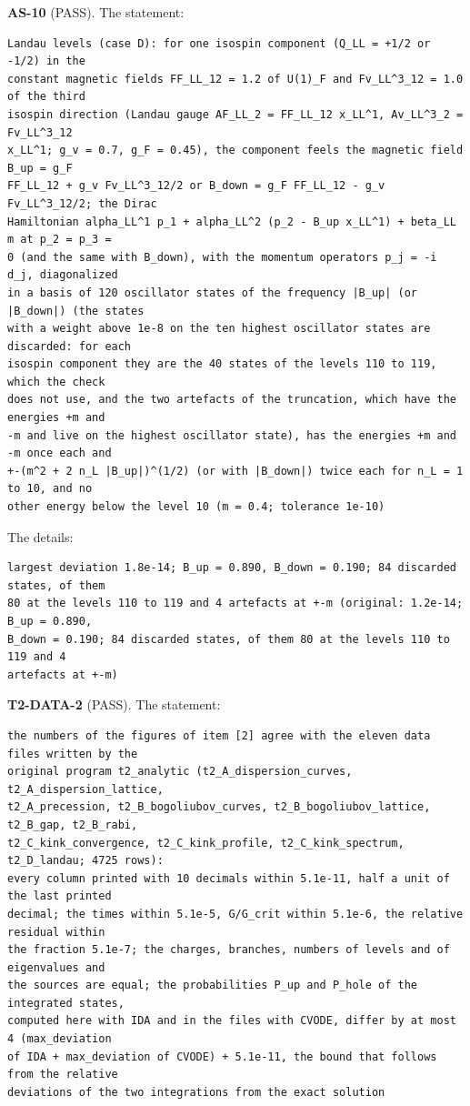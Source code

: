 \documentclass[
  10pt,
]{article}
\begin{document}
\textbf{AS-10} (PASS). The statement:

\begin{verbatim}
Landau levels (case D): for one isospin component (Q_LL = +1/2 or -1/2) in the
constant magnetic fields FF_LL_12 = 1.2 of U(1)_F and Fv_LL^3_12 = 1.0 of the third
isospin direction (Landau gauge AF_LL_2 = FF_LL_12 x_LL^1, Av_LL^3_2 = Fv_LL^3_12
x_LL^1; g_v = 0.7, g_F = 0.45), the component feels the magnetic field B_up = g_F
FF_LL_12 + g_v Fv_LL^3_12/2 or B_down = g_F FF_LL_12 - g_v Fv_LL^3_12/2; the Dirac
Hamiltonian alpha_LL^1 p_1 + alpha_LL^2 (p_2 - B_up x_LL^1) + beta_LL m at p_2 = p_3 =
0 (and the same with B_down), with the momentum operators p_j = -i d_j, diagonalized
in a basis of 120 oscillator states of the frequency |B_up| (or |B_down|) (the states
with a weight above 1e-8 on the ten highest oscillator states are discarded: for each
isospin component they are the 40 states of the levels 110 to 119, which the check
does not use, and the two artefacts of the truncation, which have the energies +m and
-m and live on the highest oscillator state), has the energies +m and -m once each and
+-(m^2 + 2 n_L |B_up|)^(1/2) (or with |B_down|) twice each for n_L = 1 to 10, and no
other energy below the level 10 (m = 0.4; tolerance 1e-10)
\end{verbatim}

The details:

\begin{verbatim}
largest deviation 1.8e-14; B_up = 0.890, B_down = 0.190; 84 discarded states, of them
80 at the levels 110 to 119 and 4 artefacts at +-m (original: 1.2e-14; B_up = 0.890,
B_down = 0.190; 84 discarded states, of them 80 at the levels 110 to 119 and 4
artefacts at +-m)
\end{verbatim}

\textbf{T2-DATA-2} (PASS). The statement:

\begin{verbatim}
the numbers of the figures of item [2] agree with the eleven data files written by the
original program t2_analytic (t2_A_dispersion_curves, t2_A_dispersion_lattice,
t2_A_precession, t2_B_bogoliubov_curves, t2_B_bogoliubov_lattice, t2_B_gap, t2_B_rabi,
t2_C_kink_convergence, t2_C_kink_profile, t2_C_kink_spectrum, t2_D_landau; 4725 rows):
every column printed with 10 decimals within 5.1e-11, half a unit of the last printed
decimal; the times within 5.1e-5, G/G_crit within 5.1e-6, the relative residual within
the fraction 5.1e-7; the charges, branches, numbers of levels and of eigenvalues and
the sources are equal; the probabilities P_up and P_hole of the integrated states,
computed here with IDA and in the files with CVODE, differ by at most 4 (max_deviation
of IDA + max_deviation of CVODE) + 5.1e-11, the bound that follows from the relative
deviations of the two integrations from the exact solution
\end{verbatim}
\end{document}
